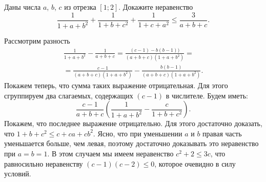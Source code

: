 \problem
{}
Даны числа $a$, $b$, $c$ из отрезка $[1; 2]$.
Докажите неравенство
\[
    \frac{1}{1 + a + b^2}
    +
    \frac{1}{1 + b + c^2}
    +
    \frac{1}{1 + c + a^2}
\leq
    \frac{3}{a + b + c}
.\]

\solution
Рассмотрим разность 
\begin{gather*}
    \frac{1}{1 + a + b^2} - \frac{1}{a + b + c}
=
    \frac{(c - 1) - b (b - 1))}{(a + b + c)(1 + a + b^2)}
=\\=
    \frac{c - 1}{(a + b + c)(1 + a + b^2)}
    -
    \frac{b (b - 1)}{(a + b + c)(1 + a + b^2)}
.\end{gather*}
Покажем теперь, что сумма таких выражение отрицательная.
Для этого сгруппируем два слагаемых, содержащих $(c - 1)$ в числителе.
Будем иметь:
\[
    \frac{c - 1}{a + b + c}
    \left(
        \frac{1}{1 + a + b^2}
        -
        \frac{c}{1 + b + c^2}
    \right)
.\]
Покажем, что последнее выражение отрицательно.
Для этого достаточно доказать, что $1 + b + c^2 \leq c + c a + c b^2$.
Ясно, что при уменьшении $a$ и $b$ правая часть уменьшается больше, чем левая,
поэтому достаточно доказывать это неравенство при $a = b = 1$.
В этом случаем мы имеем неравенство $c^2 + 2 \leq 3 c$, что равносильно
неравенству $(c - 1) (c - 2) \leq 0$, которое очевидно в силу условий.

\endproblem
